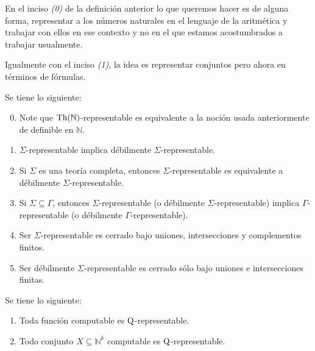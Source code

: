 \documentclass[12pt]{report}
\newcounter{it}
\theoremstyle{largebreak}
\begin{document}
    \begin{obs}
        En el inciso \textit{(0)} de la definición anterior lo que queremos hacer es de alguna forma, representar a los números naturales en el lenguaje de la aritmética y trabajar con ellos en ese contexto y no en el que estamos acostumbrados a trabajar usualmente.

        Igualmente con el inciso \textit{(1)}, la idea es representar conjuntos pero ahora en términos de fórmulas.
    \end{obs}

    \begin{obs}
        Se tiene lo siguiente:
        \begin{enumerate}[label = \textit{(\arabic*)}]
            \setcounter{enumi}{-1}
            \item Note que $\textup{Th}(\mathbb{N})$-representable es equivalente a la noción usada anteriormente de definible en $\mathbb{N}$.
            \item $\Sigma$-representable implica débilmente $\Sigma$-representable.
            \item Si $\Sigma$ es una teoría completa, entonces $\Sigma$-representable es equivalente a débilmente $\Sigma$-representable.
            \item Si $\Sigma\subseteq\Gamma$, entonces $\Sigma$-representable (o débilmente $\Sigma$-representable) implica $\Gamma$-representable (o débilmente $\Gamma$-representable).
            \item Ser $\Sigma$-representable es cerrado bajo uniones, intersecciones y complementos finitos.
            \item Ser débilmente $\Sigma$-representable es cerrado sólo bajo uniones e intersecciones finitas.
        \end{enumerate}
    \end{obs}

    \begin{theor}
        Se tiene lo siguiente:
        \begin{enumerate}[label = \textit{(\arabic*)}]
            \item Toda función computable es $\textup{Q}$-representable.
            \item Todo conjunto $X\subseteq\mathbb{N}^k$ computable es $\textup{Q}$-representable.
        \end{enumerate}
    \end{theor}
\end{document}
